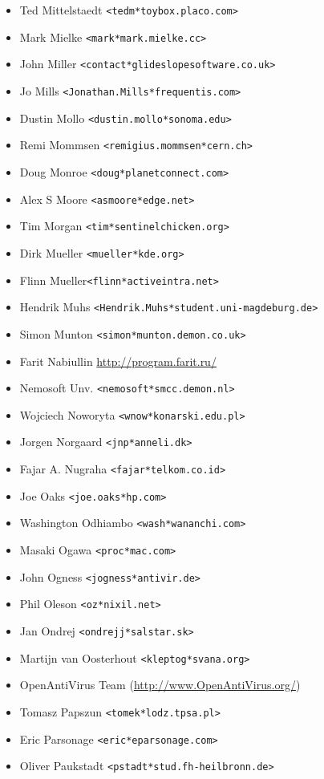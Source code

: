 \documentclass[a4paper,titlepage,12pt]{article}
\newcommand{\email}[1]{\texttt{#1}}
\begin{document}
\begin{itemize}
	\item Ted Mittelstaedt \email{<tedm*toybox.placo.com>}
	\item Mark Mielke \email{<mark*mark.mielke.cc>}
	\item John Miller \email{<contact*glideslopesoftware.co.uk>}
	\item Jo Mills \email{<Jonathan.Mills*frequentis.com>}
	\item Dustin Mollo \email{<dustin.mollo*sonoma.edu>}
	\item Remi Mommsen \email{<remigius.mommsen*cern.ch>}
	\item Doug Monroe \email{<doug*planetconnect.com>}
	\item Alex S Moore \email{<asmoore*edge.net>}
	\item Tim Morgan \email{<tim*sentinelchicken.org>}
	\item Dirk Mueller \email{<mueller*kde.org>}
	\item Flinn Mueller\email{<flinn*activeintra.net>}
	\item Hendrik Muhs \email{<Hendrik.Muhs*student.uni-magdeburg.de>}
	\item Simon Munton \email{<simon*munton.demon.co.uk>}
	\item Farit Nabiullin \url{http://program.farit.ru/}
	\item Nemosoft Unv. \email{<nemosoft*smcc.demon.nl>}
	\item Wojciech Noworyta \email{<wnow*konarski.edu.pl>}
	\item Jorgen Norgaard \email{<jnp*anneli.dk>}
	\item Fajar A. Nugraha \email{<fajar*telkom.co.id>}
	\item Joe Oaks \email{<joe.oaks*hp.com>}
	\item Washington Odhiambo \email{<wash*wananchi.com>}
	\item Masaki Ogawa \email{<proc*mac.com>}
	\item John Ogness \email{<jogness*antivir.de>}
	\item Phil Oleson \email{<oz*nixil.net>}
	\item Jan Ondrej \email{<ondrejj*salstar.sk>}
	\item Martijn van Oosterhout \email{<kleptog*svana.org>}
	\item OpenAntiVirus Team (\url{http://www.OpenAntiVirus.org/})
	\item Tomasz Papszun \email{<tomek*lodz.tpsa.pl>}
	\item Eric Parsonage \email{<eric*eparsonage.com>}
	\item Oliver Paukstadt \email{<pstadt*stud.fh-heilbronn.de>}

\end{itemize}
\end{document}
